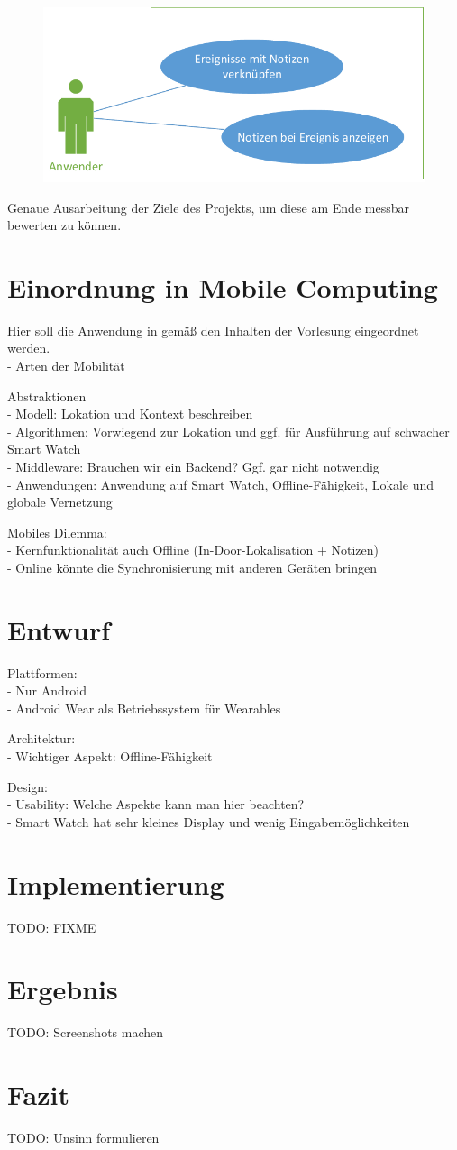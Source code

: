 \begin{figure}
\centering
\includegraphics[width=0.7\linewidth]{Bilder/UseCase-Ereignisse}
\caption{}
\label{fig:UseCase-Ereignisse}
\end{figure}


Genaue Ausarbeitung der Ziele des Projekts, um diese am Ende messbar bewerten zu können.

\section{Einordnung in Mobile Computing}
Hier soll die Anwendung in gemäß den Inhalten der Vorlesung eingeordnet werden.
\\- Arten der Mobilität

Abstraktionen
\\- Modell: Lokation und Kontext beschreiben
\\- Algorithmen: Vorwiegend zur Lokation und ggf. für Ausführung auf schwacher Smart Watch
\\- Middleware: Brauchen wir ein Backend? Ggf. gar nicht notwendig
\\- Anwendungen: Anwendung auf Smart Watch, Offline-Fähigkeit, Lokale und globale Vernetzung

Mobiles Dilemma:
\\- Kernfunktionalität auch Offline (In-Door-Lokalisation + Notizen)
\\- Online könnte die Synchronisierung mit anderen Geräten bringen

\section{Entwurf}
Plattformen:
\\- Nur Android
\\- Android Wear als Betriebssystem für Wearables

Architektur:
\\- Wichtiger Aspekt: Offline-Fähigkeit

Design:
\\- Usability: Welche Aspekte kann man hier beachten?
\\- Smart Watch hat sehr kleines Display und wenig Eingabemöglichkeiten

\section{Implementierung}
TODO: FIXME

\section{Ergebnis}
TODO: Screenshots machen

\section{Fazit}
TODO: Unsinn formulieren


\appendix


\newpage

